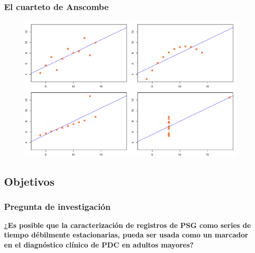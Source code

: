 \documentclass{beamer}
\begin{document}
\begin{frame}\frametitle{El cuarteto de Anscombe}
\begin{figure}
\centering
\includegraphics[width=0.9\linewidth]{anscombe.pdf} 
\end{figure}
\end{frame}


\subsection{Objetivos}

\begin{frame}\frametitle{Pregunta de investigaci\'on}
\textbf{
¿Es posible que la caracterizaci\'on de registros de PSG como series de tiempo d\'ebilmente 
estacionarias, pueda ser usada como un marcador en el diagn\'ostico cl\'inico de PDC en adultos 
mayores?
}

\end{frame}

\end{document}
